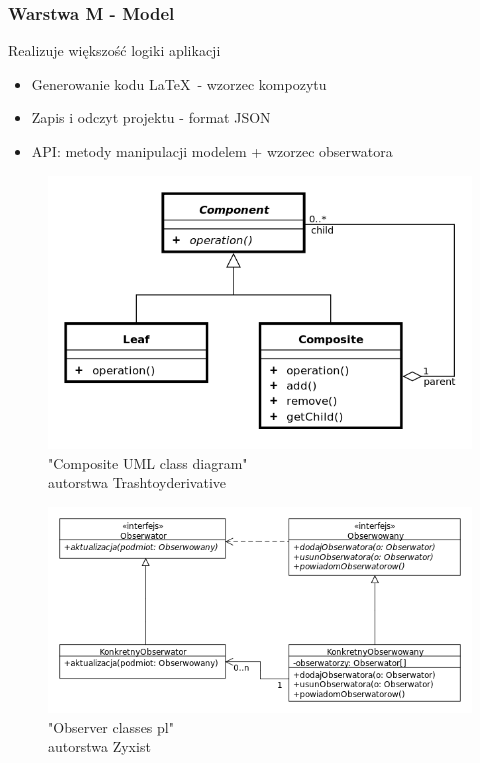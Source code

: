\documentclass[t]{beamer}
\begin{document}
\begin{frame}
	\frametitle{Warstwa M - Model}
	Realizuje większość logiki aplikacji
	\begin{itemize}
		\item Generowanie kodu \LaTeX\ - wzorzec kompozytu
		\item Zapis i odczyt projektu - format JSON				
		\item API: metody manipulacji modelem + wzorzec obserwatora
	\end{itemize}
	\hspace*{-7mm}
	\begin{minipage}{\paperwidth}
		\begin{minipage}{.5\paperwidth}
			\begin{figure}
				\includegraphics[width=.4\paperwidth]{composite.png}
				\caption{"Composite UML class diagram"\\autorstwa Trashtoyderivative}
				\label{cap}
			\end{figure}
		\end{minipage}
		\begin{minipage}{.5\paperwidth}
			\begin{figure}
				\includegraphics[width=.4\paperwidth]{observer.png}
				\caption{"Observer classes pl"\\autorstwa Zyxist}
				\label{obs}
			\end{figure}
		\end{minipage}
	\end{minipage}
\end{frame}
\end{document}
